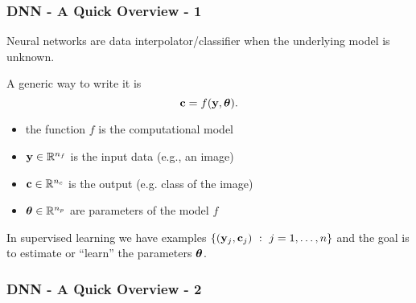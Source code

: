 \documentclass[12pt,fleqn]{beamer}
\begin{document}
\begin{frame}\frametitle{DNN - A Quick Overview - 1}

Neural networks are data interpolator/classifier when the underlying model
is unknown.

\bigskip

A generic way to write it is
$$ {\bf c} = f({\bf y},{\boldsymbol \theta}). $$


\begin{itemize}
\item the function $f$ is the computational model
\item ${\bf y}\in\mathbb{R}^{n_f}$ is the input data (e.g., an image)
\item ${\bf c}\in\mathbb{R}^{n_c}$ is the output (e.g. class of the image)
\item ${\boldsymbol \theta}\in\mathbb{R}^{n_p}$ are parameters of the model $f$
\end{itemize}

In supervised learning we have examples $\{({\bf y}_j,{\bf c}_j) \ : \ j=1,\ldots,n\}$ and the goal
is to estimate or ``learn'' the parameters ${\boldsymbol \theta}$.

\end{frame}

\begin{frame}
	\frametitle{DNN - A Quick Overview - 2}
	
	\begin{center}
		\begin{columns}
		
		\end{columns}
	\end{center}
		
		\vspace{5mm}
		\end{frame}
\end{document}
